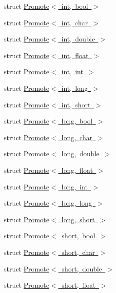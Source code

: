 \begin{DoxyCompactItemize}
struct \mbox{\hyperlink{structENSEM_1_1Promote_3_01int_00_01bool_01_4}{Promote$<$ int, bool $>$}}
\item 
struct \mbox{\hyperlink{structENSEM_1_1Promote_3_01int_00_01char_01_4}{Promote$<$ int, char $>$}}
\item 
struct \mbox{\hyperlink{structENSEM_1_1Promote_3_01int_00_01double_01_4}{Promote$<$ int, double $>$}}
\item 
struct \mbox{\hyperlink{structENSEM_1_1Promote_3_01int_00_01float_01_4}{Promote$<$ int, float $>$}}
\item 
struct \mbox{\hyperlink{structENSEM_1_1Promote_3_01int_00_01int_01_4}{Promote$<$ int, int $>$}}
\item 
struct \mbox{\hyperlink{structENSEM_1_1Promote_3_01int_00_01long_01_4}{Promote$<$ int, long $>$}}
\item 
struct \mbox{\hyperlink{structENSEM_1_1Promote_3_01int_00_01short_01_4}{Promote$<$ int, short $>$}}
\item 
struct \mbox{\hyperlink{structENSEM_1_1Promote_3_01long_00_01bool_01_4}{Promote$<$ long, bool $>$}}
\item 
struct \mbox{\hyperlink{structENSEM_1_1Promote_3_01long_00_01char_01_4}{Promote$<$ long, char $>$}}
\item 
struct \mbox{\hyperlink{structENSEM_1_1Promote_3_01long_00_01double_01_4}{Promote$<$ long, double $>$}}
\item 
struct \mbox{\hyperlink{structENSEM_1_1Promote_3_01long_00_01float_01_4}{Promote$<$ long, float $>$}}
\item 
struct \mbox{\hyperlink{structENSEM_1_1Promote_3_01long_00_01int_01_4}{Promote$<$ long, int $>$}}
\item 
struct \mbox{\hyperlink{structENSEM_1_1Promote_3_01long_00_01long_01_4}{Promote$<$ long, long $>$}}
\item 
struct \mbox{\hyperlink{structENSEM_1_1Promote_3_01long_00_01short_01_4}{Promote$<$ long, short $>$}}
\item 
struct \mbox{\hyperlink{structENSEM_1_1Promote_3_01short_00_01bool_01_4}{Promote$<$ short, bool $>$}}
\item 
struct \mbox{\hyperlink{structENSEM_1_1Promote_3_01short_00_01char_01_4}{Promote$<$ short, char $>$}}
\item 
struct \mbox{\hyperlink{structENSEM_1_1Promote_3_01short_00_01double_01_4}{Promote$<$ short, double $>$}}
\item 
struct \mbox{\hyperlink{structENSEM_1_1Promote_3_01short_00_01float_01_4}{Promote$<$ short, float $>$}}

\end{DoxyCompactItemize}
